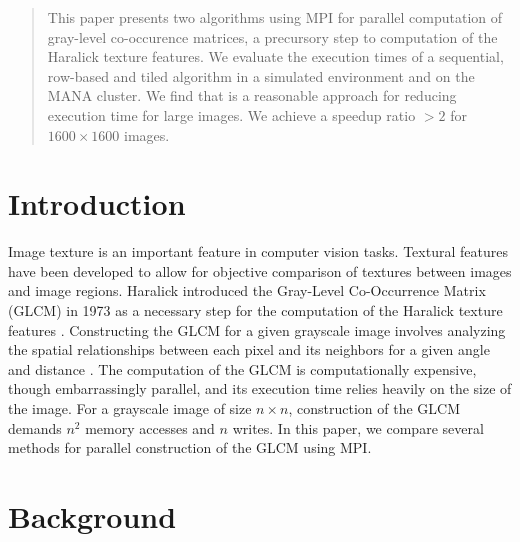 \documentclass{article}
\begin{document}


\begin{abstract}
This paper presents two algorithms using MPI for parallel computation of gray-level co-occurence matrices, a precursory step to computation of the Haralick texture features. We evaluate the execution times of a sequential, row-based and tiled algorithm in a simulated environment and on the MANA cluster. We find that is a reasonable approach for reducing execution time for large images. We achieve a speedup ratio $>2$ for $1600 \times 1600$ images. 
\end{abstract}

\section{Introduction}
    Image texture is an important feature in computer vision tasks. Textural features have been developed to allow for objective comparison of textures between images and image regions. Haralick introduced the Gray-Level Co-Occurrence Matrix (GLCM) in 1973 as a necessary step for the computation of the Haralick texture features \cite{haralick}. Constructing the GLCM for a given grayscale image involves analyzing the spatial relationships between each pixel and its neighbors for a given angle and distance \cite{haralick}. The computation of the GLCM is computationally expensive, though embarrassingly parallel, and its execution time relies heavily on the size of the image. For a grayscale image of size $n \times n$, construction of the GLCM demands $n^2$ memory accesses and $n$ writes. In this paper, we compare several methods for parallel construction of the GLCM using MPI.
\section{Background}
\end{document}
